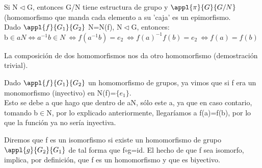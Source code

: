 \documentclass[a4paper,10pt]{apuntes}
\begin{document}
Si N$\vartriangleleft$G, entonces G/N tiene estructura de grupo y $\appl{\pi}{G}{G/N}$  (homomorfismo que manda cada
elemento a su 'caja'  es un epimorfismo.\\

Dado $\appl{f}{G_1}{G_2}$  N=N(f), N$\vartriangleleft$G, entonces:\\
b$\in aN \Leftrightarrow a^{-1}b\in N \ \Leftrightarrow f(a^{-1}b)=e_2 \ \Leftrightarrow f(a)^{-1}f(b)=e_2 \ \Leftrightarrow f(a)=f(b)$

La composición de dos homomorfismos nos da otro homomorfismo (demostración trivial).
\begin{corol}
 Dado $\appl{f}{G_1}{G_2}$  un homomorfismo de grupos, ya vimos que si f era un monomorfismo (inyectivo) en N(f)=$\{e_1\}$. \\
 Esto se debe
 a que hago que dentro de aN, sólo este a, ya que en caso contario, tomando b$\in$N, por lo explicado anteriormente, llegaríamos
 a f(a)=f(b), por lo que la función ya no sería inyectiva.
\end{corol}

\begin{defn}[Isomorfismo]
Diremos que f es un isomorfismo si existe un homomorfismo de grupo $\appl{g}{G_2}{G_1}$  de tal forma que f$\circ$g=id. El hecho de
que f sea isomorfo, implica, por definición, que f es un homomorfismo y que es biyectivo.
\end{defn}
\end{document}
